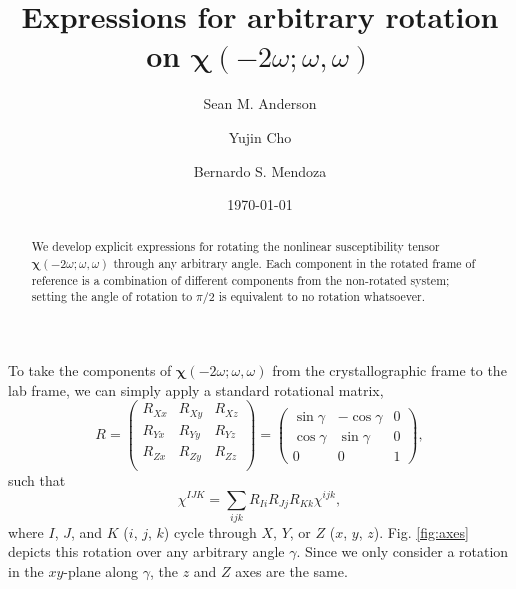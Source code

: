 \documentclass[aps,prb,10pt,letterpaper,notitlepage]{revtex4-1}
\begin{document}
\title{Expressions for arbitrary rotation on
\texorpdfstring{$\boldsymbol{\chi}(-2\omega;\omega,\omega)$}{X(2w)}}
\author{Sean M. Anderson}
\author{Yujin Cho}
\author{Bernardo S. Mendoza}
\date{\today}

\begin{abstract}
We develop explicit expressions for rotating the nonlinear susceptibility
tensor $\boldsymbol{\chi}(-2\omega;\omega,\omega)$ through any arbitrary angle.
Each component in the rotated frame of reference is a combination of different
components from the non-rotated system; setting the angle of rotation to $\pi/2$
is equivalent to no rotation whatsoever.
\end{abstract}

\maketitle

To take the components of $\boldsymbol{\chi}(-2\omega;\omega,\omega)$ from the
crystallographic frame to the lab frame, we can simply apply a standard
rotational matrix,
\begin{equation*}
R =
\begin{pmatrix}
R_{Xx} & R_{Xy} & R_{Xz} \\
R_{Yx} & R_{Yy} & R_{Yz} \\
R_{Zx} & R_{Zy} & R_{Zz} \\
\end{pmatrix}
=
\begin{pmatrix}
\sin\gamma & -\cos\gamma & 0 \\
\cos\gamma &  \sin\gamma & 0 \\
    0    &      0    & 1
\end{pmatrix},
\end{equation*}
such that
\begin{equation*}
\chi^{IJK} = \sum_{ijk}R_{Ii}R_{Jj}R_{Kk}\chi^{ijk},
\end{equation*}
where $I$, $J$, and $K$ ($i$, $j$, $k$) cycle through $X$, $Y$, or $Z$ ($x$,
$y$, $z$). Fig. \ref{fig:axes} depicts this rotation over any arbitrary angle
$\gamma$. Since we only consider a rotation in the $xy$-plane along $\gamma$,
the $z$ and $Z$ axes are the same.
\end{document}
